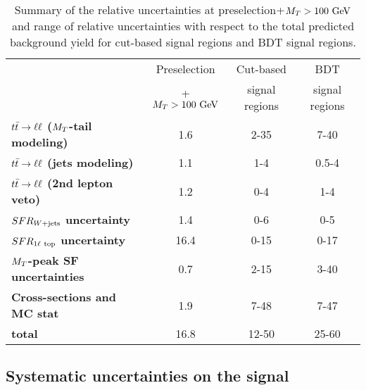             \begin{table}[!ht]
                \begin{center}
                    \begin{tabular}{|l|c|cc|}
                        \hline
                                                                       & Preselection    & Cut-based      & BDT             \\
                                                                       & + $M_T>100~\text{GeV}$ & signal regions & signal regions  \\
                        \hline
                        \textbf{$t\bar{t} \rightarrow \ell \ell$ ($M_T$-tail modeling)}  & 1.6                      & 2-35         & 7-40    \\
                        \textbf{$t\bar{t} \rightarrow \ell \ell$ (jets modeling)}        & 1.1                      & 1-4          & 0.5-4   \\
                        \textbf{$t\bar{t} \rightarrow \ell \ell$ (2nd lepton veto)}      & 1.2                      & 0-4          & 1-4     \\
                        \textbf{$SFR_{\text{$W$+jets}}$ uncertainty}               & 1.4                      & 0-6          & 0-5     \\
                        \textbf{$SFR_{1\ell~\text{top}}$ uncertainty}        & 16.4                     & 0-15         & 0-17    \\
                        \textbf{$M_T$-peak SF uncertainties}           & 0.7                      & 2-15         & 3-40    \\
                        \textbf{Cross-sections and MC stat}            & 1.9                      & 7-48         & 7-47    \\
                        \hline
                        \textbf{total}                                 & 16.8                     & 12-50        & 25-60   \\
                        \hline
                    \end{tabular}
                    \caption{Summary of the relative uncertainties at preselection+$M_T>100~\text{GeV}$ 
                    and range of relative uncertainties with respect to the total predicted 
                    background yield for cut-based signal regions and BDT signal regions. 
                    \label{tab:systematicsSummary}} 
                \end{center}
            \end{table}

        \subsection{Systematic uncertainties on the signal}

